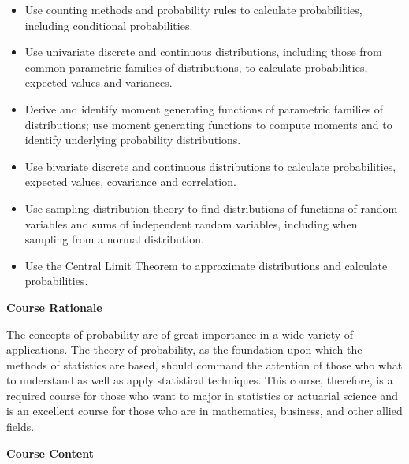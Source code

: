 \documentclass{article}
\begin{document}
\begin{itemize}
    \item Use counting methods and probability rules to calculate probabilities, including conditional
    probabilities.
    \item Use univariate discrete and continuous distributions, including those from common parametric
    families of distributions, to calculate probabilities, expected values and variances.
    \item Derive and identify moment generating functions of parametric families of distributions; use moment generating functions to compute moments and to identify underlying probability
    distributions.
    \item Use bivariate discrete and continuous distributions to calculate probabilities, expected values,
    covariance and correlation.
    \item Use sampling distribution theory to find distributions of functions of random variables and sums
    of independent random variables, including when sampling from a normal distribution.
    \item Use the Central Limit Theorem to approximate distributions and calculate probabilities.
\end{itemize}\bigskip

\textbf{\large Course Rationale}\medskip

The concepts of probability are of great importance in a wide variety of applications.
The theory of probability, as the foundation upon which the methods of statistics are based, should command the attention of those who what to understand as well as apply statistical techniques. This course, therefore, is a required course for those who want to major in statistics or actuarial science and is an excellent course for those who are in mathematics, business, and other allied fields.\bigskip

\textbf{\large Course Content}\medskip
\end{document}
